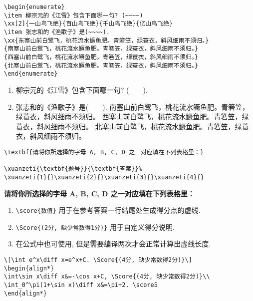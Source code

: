 \documentclass{hfutexam}
\newcommand{\diff}{\,\mathrm{d}}
\begin{document}
\textit{\color{blue}{选择题示例:}}
\begin{lstlisting}
\begin{enumerate}
\item 柳宗元的《江雪》包含下面哪一句? (~~~~)
\xx[2]{一山鸟飞绝}{百山鸟飞绝}{千山鸟飞绝}{亿山鸟飞绝}
\item 张志和的《渔歌子》是(~~~~).
\xx{东塞山前白鹭飞，桃花流水鳜鱼肥。青箬笠，绿蓑衣，斜风细雨不须归。}
{南塞山前白鹭飞，桃花流水鳜鱼肥。青箬笠，绿蓑衣，斜风细雨不须归。}
{西塞山前白鹭飞，桃花流水鳜鱼肥。青箬笠，绿蓑衣，斜风细雨不须归。}
{北塞山前白鹭飞，桃花流水鳜鱼肥。青箬笠，绿蓑衣，斜风细雨不须归。}
\end{enumerate}
\end{lstlisting}

\begin{tcolorbox}
\begin{enumerate}
\item 柳宗元的《江雪》包含下面哪一句? (~~~~).
\item 张志和的《渔歌子》是(~~~~).
{南塞山前白鹭飞，桃花流水鳜鱼肥。青箬笠，绿蓑衣，斜风细雨不须归。}
{西塞山前白鹭飞，桃花流水鳜鱼肥。青箬笠，绿蓑衣，斜风细雨不须归。}
{北塞山前白鹭飞，桃花流水鳜鱼肥。青箬笠，绿蓑衣，斜风细雨不须归。}
\end{enumerate}
\end{tcolorbox}

\textit{\color{blue}{选择题示例:}}
\begin{lstlisting}
\textbf{请将你所选择的字母 A, B, C, D 之一对应填在下列表格里：}

\xuanzeti{\textbf{题号}}{\textbf{答案}}%
\xuanzeti{1}{}\xuanzeti{2}{}\xuanzeti{3}{}\xuanzeti{4}{}
\end{lstlisting}

\begin{tcolorbox}
\textbf{请将你所选择的字母 A, B, C, D 之一对应填在下列表格里：}

%
\end{tcolorbox}

\newpage
{}
\begin{enumerate}[resume]
\item \lstinline|\score{数值}| 用于在参考答案一行结尾处生成得分点的虚线.
\item \lstinline|\Score{(2分, 缺少常数得1分)}| 用于自定义得分说明.
\item 在公式中也可使用, 但是需要编译两次才会正常计算出虚线长度.
\end{enumerate}
\textit{\color{blue}{得分点示例:}}
\begin{lstlisting}
\[\int e^x\diff x=e^x+C. \Score{(4分, 缺少常数得2分)}\]
\begin{align*}
\int\sin x\diff x&=-\cos x+C, \Score{(4分, 缺少常数得2分)}\\
\int_0^\pi(1+\sin x)\diff x&=\pi+2. \score5
\end{align*}
\end{lstlisting}
\end{document}
